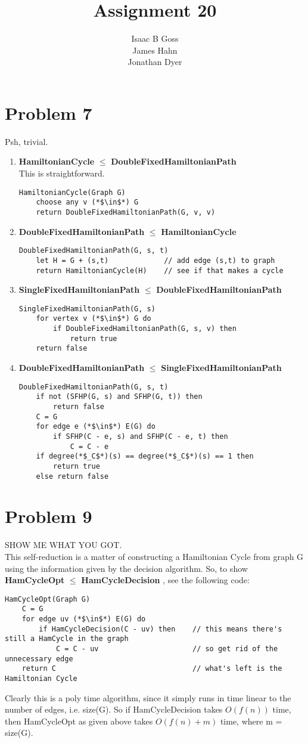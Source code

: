 \documentclass{article}
\author{Isaac B Goss\\ James Hahn\\ Jonathan Dyer}
\title{Assignment 20}
\providecommand{\prob}[1]{\section*{Problem #1}}
\providecommand{\reducible}[2]{
  \textbf{#1} $\leq$ \textbf{#2}
}
\begin{document}
\maketitle
\prob{7}
Psh, trivial.
\begin{enumerate}
  \item \reducible{HamiltonianCycle}{DoubleFixedHamiltonianPath} \\
        This is straightforward.
  \begin{lstlisting}
HamiltonianCycle(Graph G)
    choose any v (*$\in$*) G
    return DoubleFixedHamiltonianPath(G, v, v)
  \end{lstlisting}

  \item \reducible{DoubleFixedHamiltonianPath}{HamiltonianCycle}
  \begin{lstlisting}
DoubleFixedHamiltonianPath(G, s, t)
    let H = G + (s,t)             // add edge (s,t) to graph
    return HamiltonianCycle(H)    // see if that makes a cycle
  \end{lstlisting}

  \item \reducible{SingleFixedHamiltonianPath}{DoubleFixedHamiltonianPath}
  \begin{lstlisting}
SingleFixedHamiltonianPath(G, s)
    for vertex v (*$\in$*) G do
        if DoubleFixedHamiltonianPath(G, s, v) then
            return true
    return false
  \end{lstlisting}

  \item \reducible{DoubleFixedHamiltonianPath}{SingleFixedHamiltonianPath}
  \begin{lstlisting}
DoubleFixedHamiltonianPath(G, s, t)
    if not (SFHP(G, s) and SFHP(G, t)) then
        return false
    C = G
    for edge e (*$\in$*) E(G) do
        if SFHP(C - e, s) and SFHP(C - e, t) then
            C = C - e
    if degree(*$_C$*)(s) == degree(*$_C$*)(s) == 1 then
        return true
    else return false

  \end{lstlisting}

\end{enumerate}

\prob{9}
SHOW ME WHAT YOU GOT.\\
This self-reduction is a matter of constructing a Hamiltonian Cycle from graph G using the information given by the decision algorithm.
So, to show \reducible{HamCycleOpt}{HamCycleDecision}, see the following code:
\begin{lstlisting}
HamCycleOpt(Graph G)
    C = G
    for edge uv (*$\in$*) E(G) do
        if HamCycleDecision(C - uv) then    // this means there's still a HamCycle in the graph
            C = C - uv                      // so get rid of the unnecessary edge
    return C                                // what's left is the Hamiltonian Cycle
\end{lstlisting}
Clearly this is a poly time algorithm, since it simply runs in time linear to the number of edges, i.e. size(G). So if HamCycleDecision takes $O(f(n))$ time, then HamCycleOpt as given above takes $O(f(n) + m)$ time, where m = size(G).
\end{document}
